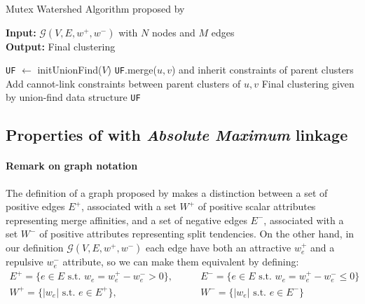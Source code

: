 \begin{algorithm}
  \caption{Mutex Watershed Algorithm proposed by \cite{wolf2018mutex}}
\hspace*{\algorithmicindent} \textbf{Input:} $\mathcal{G}(V,E,w^+,w^-)$ with $N$ nodes and $M$ edges \\
\hspace*{\algorithmicindent} \textbf{Output:} Final clustering \\
  \hspace*{\algorithmicindent} 
  \begin{algorithmic}[1]
      \State \texttt{UF} $\gets$ initUnionFind($V$) 
         
            
            \State \texttt{UF}.merge($u,v$) and inherit constraints of parent clusters
            \State Add cannot-link constraints between parent clusters of $u,v$
          \EndIf
        \EndIf
      \EndFor
      \State
      \Return Final clustering given by union-find data structure \texttt{UF}
  \end{algorithmic}
  \label{alg:mutex_watershed}
\end{algorithm}



\subsection{Properties of \algname{} with \emph{Absolute Maximum} linkage}
\paragraph{Remark on graph notation} The definition of a graph proposed by \cite{wolf2018mutex} makes a distinction between a set of positive edges $E^+$, associated with a set $W^+$ of positive scalar attributes representing merge affinities, and a set of negative edges $E^-$, associated with a set $W^-$ of positive attributes representing split tendencies. On the other hand, in our definition $\mathcal{G}(V,E,w^+,w^-)$ each edge have both an attractive $w_e^+$ and a repulsive $w_e^-$ attribute, so we can make them equivalent by defining:
\begin{align}
E^+ = \{ e \in E \,\,\text{s.t.} \,\,w_e = w_e^+ - w_e^- > 0\},& \qquad E^- = \{ e \in E \,\,\text{s.t.}\,\, w_e = w_e^+ - w_e^- \leq 0\} \\
W^+ = \{ |w_e| \,\,\text{s.t.}\,\, e \in E^+\},& \qquad W^- = \{ |w_e| \,\,\text{s.t.}\,\, e \in E^-\}
\end{align}

